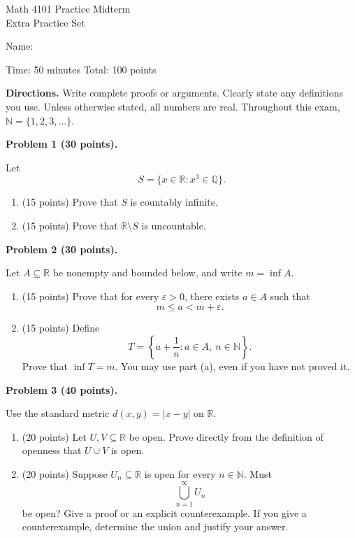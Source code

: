 \documentclass[11pt]{amsart}
\begin{document}
\begin{center}
    {\large Math 4101 Practice Midterm}\\[2pt]
    {\large Extra Practice Set}
\end{center}

\noindent Name: \underline{\hspace{2in}}

\medskip
\noindent Time: 50 minutes \hfill Total: 100 points

\medskip
\noindent \textbf{Directions.} Write complete proofs or arguments. Clearly state any definitions you use.
Unless otherwise stated, all numbers are real. Throughout this exam, $\mathbb{N} = \{1, 2, 3, \dots\}$.

\bigskip

\noindent\textbf{Problem 1 (30 points).}

\noindent Let
\[
S = \{x \in \mathbb{R} : x^3 \in \mathbb{Q}\}.
\]

\begin{enumerate}[label=(\alph*)]
    \item (15 points) Prove that $S$ is countably infinite.
    \item (15 points) Prove that $\mathbb{R} \setminus S$ is uncountable.
\end{enumerate}

\bigskip

\noindent\textbf{Problem 2 (30 points).}

\noindent Let $A \subseteq \mathbb{R}$ be nonempty and bounded below, and write $m = \inf A$.

\begin{enumerate}[label=(\alph*)]
    \item (15 points) Prove that for every $\varepsilon > 0$, there exists $a \in A$ such that
    \[
    m \le a < m + \varepsilon.
    \]
    \item (15 points) Define
    \[
    T = \left\{ a + \frac{1}{n} : a \in A,\ n \in \mathbb{N} \right\}.
    \]
    Prove that $\inf T = m$. You may use part (a), even if you have not proved it.
\end{enumerate}

\bigskip

\noindent\textbf{Problem 3 (40 points).}

\noindent Use the standard metric $d(x,y) = |x-y|$ on $\mathbb{R}$.

\begin{enumerate}[label=(\alph*)]
    \item (20 points) Let $U, V \subseteq \mathbb{R}$ be open. Prove directly from the definition of openness that $U \cup V$ is open.
    \item (20 points) Suppose $U_n \subseteq \mathbb{R}$ is open for every $n \in \mathbb{N}$. Must
    \[
    \bigcup_{n=1}^{\infty} U_n
    \]
    be open? Give a proof or an explicit counterexample. If you give a counterexample, determine the union and justify your answer.
\end{enumerate}
\end{document}

